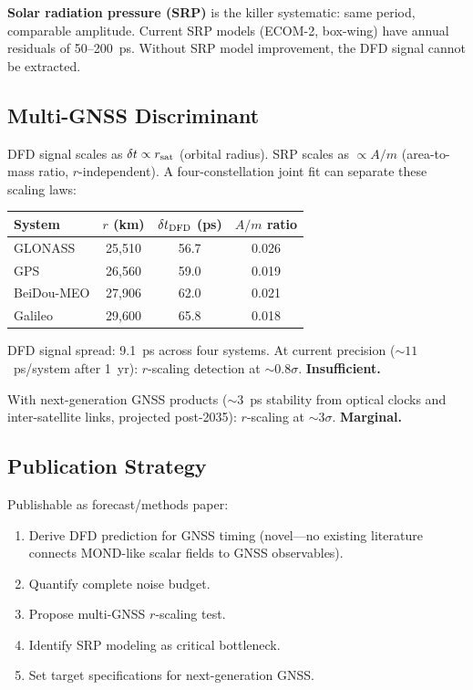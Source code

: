 \documentclass[11pt,a4paper]{article}
\newcounter{findingctr}
\newenvironment{finding}[1][]{%
  \refstepcounter{findingctr}%
  \begin{tcolorbox}[colback=blue!3!white, colframe=blue!50!black,
    title=\textbf{Finding \thefindingctr: #1}]
}{%
  \end{tcolorbox}%
}
\begin{document}
\begin{finding}[\textbf{GPS Protocol: Publishable Methods Paper,
  Detection Not Achievable Now}]
\textbf{Solar radiation pressure (SRP)} is the killer systematic:
same period, comparable amplitude.  Current SRP models (ECOM-2,
box-wing) have annual residuals of 50--200~ps.  Without SRP model
improvement, the DFD signal cannot be extracted.

\subsection*{Multi-GNSS Discriminant}

DFD signal scales as $\delta t \propto r_{\rm sat}$ (orbital radius).
SRP scales as $\propto A/m$ (area-to-mass ratio, $r$-independent).
A four-constellation joint fit can separate these scaling laws:

\begin{center}
\begin{tabular}{lccc}
\toprule
\textbf{System} & $r$ (km) & $\delta t_{\rm DFD}$ (ps) & $A/m$ ratio \\
\midrule
GLONASS & 25,510 & 56.7 & 0.026 \\
GPS & 26,560 & 59.0 & 0.019 \\
BeiDou-MEO & 27,906 & 62.0 & 0.021 \\
Galileo & 29,600 & 65.8 & 0.018 \\
\bottomrule
\end{tabular}
\end{center}

DFD signal spread: 9.1~ps across four systems.  At current precision
($\sim 11$~ps/system after 1~yr): $r$-scaling detection at
$\sim 0.8\sigma$.  \textbf{Insufficient.}

With next-generation GNSS products ($\sim 3$~ps stability from
optical clocks and inter-satellite links, projected post-2035):
$r$-scaling at $\sim 3\sigma$.  \textbf{Marginal.}

\subsection*{Publication Strategy}

Publishable as forecast/methods paper:
\begin{enumerate}[nosep]
\item Derive DFD prediction for GNSS timing (novel---no existing
  literature connects MOND-like scalar fields to GNSS observables).
\item Quantify complete noise budget.
\item Propose multi-GNSS $r$-scaling test.
\item Identify SRP modeling as critical bottleneck.
\item Set target specifications for next-generation GNSS.
\end{enumerate}


\end{finding}
\end{document}
